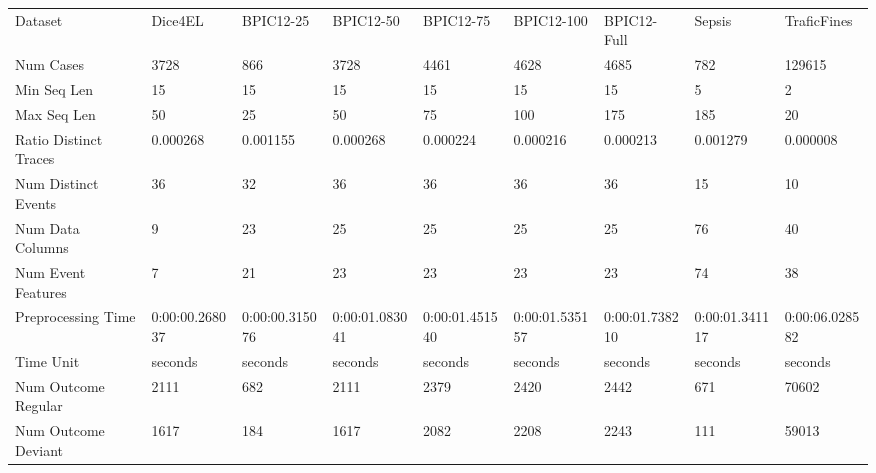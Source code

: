 \begin{tabular}{lllllllll}
Dataset & Dice4EL & BPIC12-25 & BPIC12-50 & BPIC12-75 & BPIC12-100 & BPIC12-Full & Sepsis & TraficFines \\
Num Cases & 3728 & 866 & 3728 & 4461 & 4628 & 4685 & 782 & 129615 \\
Min Seq Len & 15 & 15 & 15 & 15 & 15 & 15 & 5 & 2 \\
Max Seq Len & 50 & 25 & 50 & 75 & 100 & 175 & 185 & 20 \\
Ratio Distinct Traces & 0.000268 & 0.001155 & 0.000268 & 0.000224 & 0.000216 & 0.000213 & 0.001279 & 0.000008 \\
Num Distinct Events & 36 & 32 & 36 & 36 & 36 & 36 & 15 & 10 \\
Num Data Columns & 9 & 23 & 25 & 25 & 25 & 25 & 76 & 40 \\
Num Event Features & 7 & 21 & 23 & 23 & 23 & 23 & 74 & 38 \\
Preprocessing Time & 0:00:00.268037 & 0:00:00.315076 & 0:00:01.083041 & 0:00:01.451540 & 0:00:01.535157 & 0:00:01.738210 & 0:00:01.341117 & 0:00:06.028582 \\
Time Unit & seconds & seconds & seconds & seconds & seconds & seconds & seconds & seconds \\
Num Outcome Regular & 2111 & 682 & 2111 & 2379 & 2420 & 2442 & 671 & 70602 \\
Num Outcome Deviant & 1617 & 184 & 1617 & 2082 & 2208 & 2243 & 111 & 59013 \\
\end{tabular}
